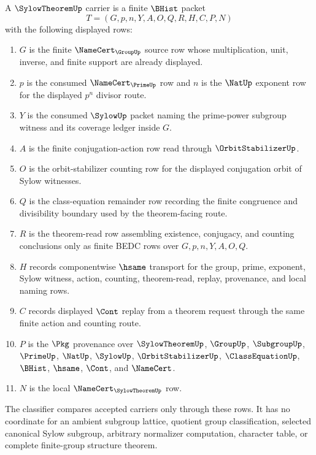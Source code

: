 \begin{definition}
\label{def:sylow-theorem-carrier}
A $\SylowTheoremUp$ carrier is a finite $\BHist$ packet
$$
T=(G,p,n,Y,A,O,Q,R,H,C,P,N)
$$
with the following displayed rows:
\begin{enumerate}
\item $G$ is the finite $\NameCert_{\GroupUp}$ source row whose multiplication, unit, inverse, and finite support are already displayed.
\item $p$ is the consumed $\NameCert_{\PrimeUp}$ row and $n$ is the $\NatUp$ exponent row for the displayed $p^{n}$ divisor route.
\item $Y$ is the consumed $\SylowUp$ packet naming the prime-power subgroup witness and its coverage ledger inside $G$.
\item $A$ is the finite conjugation-action row read through $\OrbitStabilizerUp$.
\item $O$ is the orbit-stabilizer counting row for the displayed conjugation orbit of Sylow witnesses.
\item $Q$ is the class-equation remainder row recording the finite congruence and divisibility boundary used by the theorem-facing route.
\item $R$ is the theorem-read row assembling existence, conjugacy, and counting conclusions only as finite BEDC rows over $G,p,n,Y,A,O,Q$.
\item $H$ records componentwise $\hsame$ transport for the group, prime, exponent, Sylow witness, action, counting, theorem-read, replay, provenance, and local naming rows.
\item $C$ records displayed $\Cont$ replay from a theorem request through the same finite action and counting route.
\item $P$ is the $\Pkg$ provenance over $\SylowTheoremUp$, $\GroupUp$, $\SubgroupUp$, $\PrimeUp$, $\NatUp$, $\SylowUp$, $\OrbitStabilizerUp$, $\ClassEquationUp$, $\BHist$, $\hsame$, $\Cont$, and $\NameCert$.
\item $N$ is the local $\NameCert_{\SylowTheoremUp}$ row.
\end{enumerate}
The classifier compares accepted carriers only through these rows. It has no coordinate for an ambient subgroup lattice, quotient group classification, selected canonical Sylow subgroup, arbitrary normalizer computation, character table, or complete finite-group structure theorem.
\end{definition}

